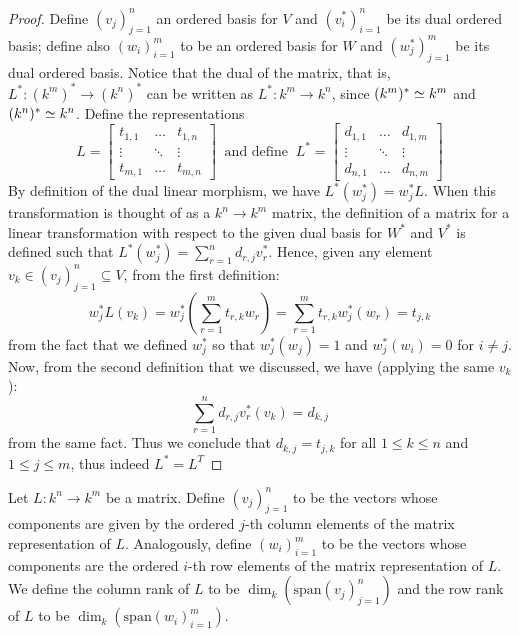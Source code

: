 \begin{proof}
Define \((v_j)_{j=1}^n\) an ordered basis for \(V\) and \((v_i^\ast)_{i=1}^n\)
be its dual ordered basis; define also \((w_i)_{i=1}^m\) to be an ordered
basis for \(W\) and \((w_j^\ast)_{j=1}^m\) be its dual ordered basis. Notice
that the dual of the matrix, that is, \(L^\ast : (k^m)^\ast \to (k^n)^\ast\)
can be written as \(L^\ast : k^m \to k^n\), since \((k^m)^\ast \simeq k^m\) and
\((k^n)^\ast \simeq k^n\). Define the representations
\[
  L =
  \begin{bmatrix}
    t_{1, 1} & \dots   & t_{1, n} \\
    \vdots   & \ddots  & \vdots   \\
    t_{m, 1} & \dots   & t_{m, n}
  \end{bmatrix}
  \ \text{ and define }\
  L^\ast =
  \begin{bmatrix}
    d_{1, 1} & \dots   & d_{1, m} \\
    \vdots   & \ddots  & \vdots   \\
    d_{n, 1} & \dots   & d_{n, m}
  \end{bmatrix}
\]
By definition of the dual linear morphism, we have \(L^\ast(w_j^\ast) =
w_j^\ast  L\). When this transformation is thought of as a \(k^n \to
k^m\) matrix, the definition of a matrix for a linear transformation with
respect to the given dual basis for \(W^\ast\) and \(V^\ast\) is defined such
that \(L^\ast(w_j^\ast) = \sum_{r = 1}^n d_{r, j} v_r^\ast\). Hence, given any
element \(v_k \in (v_j)_{j=1}^n \subseteq V\), from the first definition:
\begin{equation}
  w_j^\ast  L (v_k)
  = w_j^\ast \left( \sum_{r=1}^m t_{r, k} w_r \right)
  = \sum_{r=1}^m t_{r, k} w_j^\ast(w_r)
  = t_{j, k}
\end{equation}
from the fact that we defined \(w_j^\ast\) so that \(w_j^\ast(w_j) = 1\) and
\(w_j^\ast(w_i) = 0\) for \(i \neq j\). Now, from the second definition that
we discussed, we have (applying the same \(v_k\)):
\begin{equation}
  \sum_{r=1}^n d_{r,j} v_r^\ast(v_k)
  = d_{k, j}
\end{equation}
from the same fact. Thus we conclude that \(d_{k,j} = t_{j,k}\) for all \(1
\leq k \leq n\) and \(1 \leq j \leq m\), thus indeed \(L^\ast = L^T\)
\end{proof}

\begin{definition}\label{def: column and row rank}
Let \(L: k^n \to k^m\) be a matrix. Define \((v_j)_{j=1}^n\) to be the vectors
whose components are given by the ordered \(j\)-th column elements of the
matrix representation of \(L\). Analogously, define \((w_i)_{i=1}^m\) to be
the vectors whose components are the ordered \(i\)-th row elements of the
matrix representation of \(L\). We define the column rank of \(L\) to be
\(\dim_k(\mathrm{span}(v_j)_{j=1}^n)\) and the row rank of \(L\) to be
\(\dim_k(\mathrm{span}(w_i)_{i=1}^m)\).
\end{definition}


